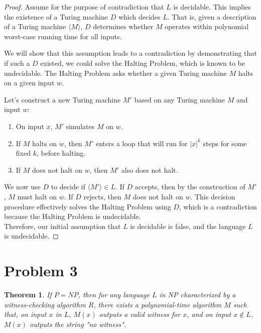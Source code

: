 \documentclass[a4paper,10pt]{article}
\newtheorem{theorem}{Theorem}
\begin{document}
\begin{proof}
Assume for the purpose of contradiction that $L$ is decidable. This implies the existence of a Turing machine $D$ which decides $L$. That is, given a description of a Turing machine $\langle M \rangle$, $D$ determines whether $M$ operates within polynomial worst-case running time for all inputs.

We will show that this assumption leads to a contradiction by demonstrating that if such a $D$ existed, we could solve the Halting Problem, which is known to be undecidable. The Halting Problem asks whether a given Turing machine $M$ halts on a given input $w$.

Let's construct a new Turing machine $M'$ based on any Turing machine $M$ and input $w$:

\begin{enumerate}
\item On input $x$, $M'$ simulates $M$ on $w$.
\item If $M$ halts on $w$, then $M'$ enters a loop that will run for $|x|^k$ steps for some fixed $k$, before halting.
\item If $M$ does not halt on $w$, then $M'$ also does not halt.
\end{enumerate}

We now use $D$ to decide if $\langle M' \rangle \in L$. If $D$ accepts, then by the construction of $M'$, $M$ must halt on $w$. If $D$ rejects, then $M$ does not halt on $w$. This decision procedure effectively solves the Halting Problem using $D$, which is a contradiction because the Halting Problem is undecidable.
\\
Therefore, our initial assumption that $L$ is decidable is false, and the language $L$ is undecidable.
\end{proof}
\pagebreak
\section{Problem 3}
\begin{theorem}
If \( P = NP \), then for any language \( L \) in NP characterized by a witness-checking algorithm \( R \), there exists a polynomial-time algorithm \( M \) such that, on input \( x \) in \( L \), \( M(x) \) outputs a valid witness for \( x \), and on input \( x \notin L \), \( M(x) \) outputs the string "no witness".
\end{theorem}
\end{document}
